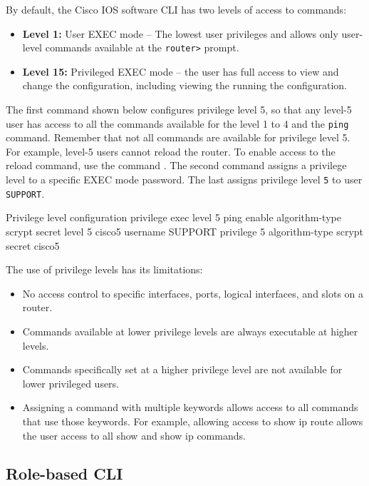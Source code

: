 By default, the Cisco IOS software CLI has two levels of access to commands:

\begin{itemize}
\item \textbf{Level 1:} User EXEC mode -- The lowest user privileges and allows only user-level commands available at the \verb|router>| prompt.
\item \textbf{Level 15:} Privileged EXEC mode -- the user has full access to view and change the configuration, including viewing the running the configuration.
\end{itemize}

The first command shown below configures privilege level 5, so that any level-5 user has access to all the commands available for the level 1 to 4 and the \texttt{ping} command. Remember that not all commands are available for privilege level 5. For example, level-5 users cannot reload the router. To enable access to the reload command, use the command . The second command assigns a privilege level to a specific EXEC mode password. The last assigns privilege level \texttt{5} to user \texttt{SUPPORT}. 

\begin{sexylisting}{Privilege level configuration}
privilege exec level 5 ping 
enable algorithm-type scrypt secret level 5 cisco5
username SUPPORT privilege 5 algorithm-type scrypt secret cisco5
\end{sexylisting}

The use of privilege levels has its limitations:

\begin{itemize}
\item No access control to specific interfaces, ports, logical interfaces, and slots on a router.
\item Commands available at lower privilege levels are always executable at higher levels.
\item Commands specifically set at a higher privilege level are not available for lower privileged users.
\item Assigning a command with multiple keywords allows access to all commands that use those keywords. For example, allowing access to show ip route allows the user access to all show and show ip commands.
\end{itemize}

\subsection{Role-based CLI}

